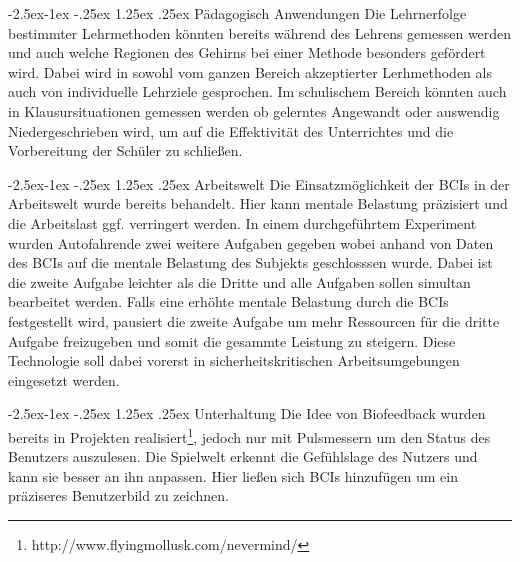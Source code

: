\documentclass[11pt,ngerman,parskip=half]{scrartcl}
\makeatletter
\renewcommand\paragraph{\@startsection{paragraph}{4}{\z@}%
            {-2.5ex\@plus -1ex \@minus -.25ex}%
            {1.25ex \@plus .25ex}%
            {\normalfont\normalsize\bfseries}}
\makeatother
\begin{document}
\paragraph{Pädagogisch Anwendungen}
Die Lehrnerfolge bestimmter Lehrmethoden könnten bereits während des Lehrens
gemessen werden und auch welche Regionen des Gehirns bei einer Methode
besonders gefördert wird. Dabei wird in \parencite{beyond} sowohl vom ganzen
Bereich akzeptierter Lerhmethoden als auch von individuelle Lehrziele
gesprochen. Im schulischem Bereich könnten auch in Klausursituationen
gemessen werden ob gelerntes Angewandt oder auswendig Niedergeschrieben wird,
um auf die Effektivität des Unterrichtes und die Vorbereitung der Schüler zu
schließen.

\paragraph{Arbeitswelt}
Die Einsatzmöglichkeit der BCIs in der Arbeitswelt wurde bereits
behandelt\parencite{beyond,workload}. Hier kann mentale Belastung präzisiert
und die Arbeitslast ggf. verringert werden. In einem durchgeführtem
Experiment\parencite[24.3]{workload} wurden Autofahrende zwei weitere
Aufgaben gegeben wobei anhand von Daten des BCIs auf die mentale Belastung des
Subjekts geschlosssen wurde. Dabei ist die zweite Aufgabe leichter als die Dritte
und alle Aufgaben sollen simultan bearbeitet werden. Falls eine erhöhte
mentale Belastung durch die BCIs festgestellt wird, pausiert die zweite
Aufgabe um mehr Ressourcen für die dritte Aufgabe freizugeben und somit die
gesammte Leistung zu steigern. Diese Technologie soll dabei vorerst in sicherheitskritischen Arbeitsumgebungen eingesetzt werden.

\paragraph{Unterhaltung}
 Die Idee von Biofeedback wurden bereits in Projekten
 realisiert\footnote{http://www.flyingmollusk.com/nevermind/}, jedoch nur mit
 Pulsmessern um den Status des Benutzers auszulesen. Die Spielwelt erkennt die Gefühlslage des Nutzers und kann sie besser an ihn anpassen.
Hier ließen sich BCIs hinzufügen um ein präziseres Benutzerbild zu zeichnen.
\end{document}
